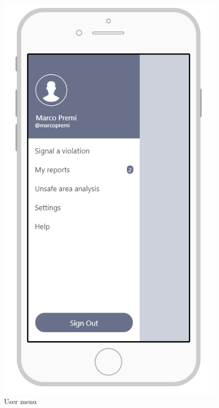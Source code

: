 \documentclass{article}
\begin{document}
\begin{figure}[H]
    \centering
    \includegraphics[scale=0.7]{Images/MenuAPP}
    \caption{User menu}
\end{figure}
\end{document}
